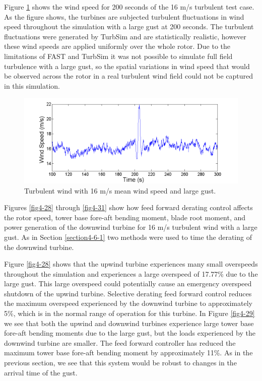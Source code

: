Figure \ref{fig4-27} shows the wind speed for 200 seconds of the 16 m/s turbulent test case. As the figure shows, the turbines are subjected turbulent fluctuations in wind speed throughout the simulation with a large gust at 200 seconds. The turbulent fluctuations were generated by TurbSim and are statistically realistic, however these wind speeds are applied uniformly over the whole rotor. Due to the limitations of FAST and TurbSim it was not possible to simulate full field turbulence with a large gust, so the spatial variations in wind speed that would be observed across the rotor in a real turbulent wind field could not be captured in this simulation.

\begin{figure}[htb]
	\centering
		\includegraphics[width = \linewidth]{Figures/ch4Figures/fig4-27.png}
		
	\caption{Turbulent wind with 16 m/s mean wind speed and large gust.}
	\label{fig4-27}
\end{figure}

Figures \ref{fig4-28} through \ref{fig4-31} show how feed forward derating control affects the rotor speed, tower base fore-aft bending moment, blade root moment, and power generation of the downwind turbine for 16 m/s turbulent wind with a large gust. As in Section \ref{section4-6-1} two methods were used to time the derating of the downwind turbine.

Figure \ref{fig4-28} shows that the upwind turbine experiences many small overspeeds throughout the simulation and experiences a large overspeed of 17.77\% due to the large gust. This large overspeed could potentially cause an emergency overspeed shutdown of the upwind turbine. Selective derating feed forward control reduces the maximum overspeed experienced by the downwind turbine to approximately 5\%, which is in the normal range of operation for this turbine. In Figure \ref{fig4-29} we see that both the upwind and downwind turbines experience large tower base fore-aft bending moments due to the large gust, but the loads experienced by the downwind turbine are smaller. The feed forward controller has reduced the maximum tower base fore-aft bending moment by approximately 11\%. As in the previous section, we see that this system would be robust to changes in the arrival time of the gust. 

